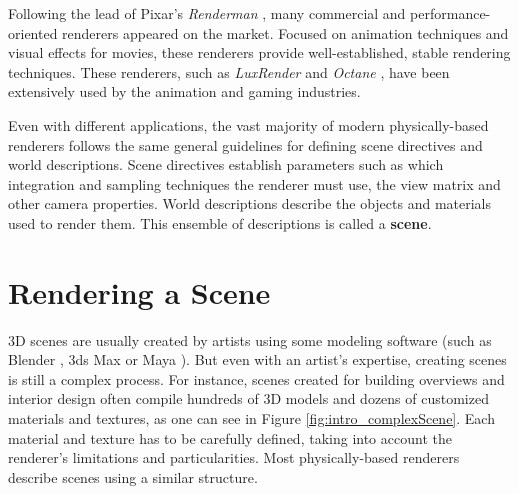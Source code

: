 Following the lead of Pixar's \textit{Renderman} \cite{renderman}, many 
commercial and performance-oriented renderers appeared on the market. Focused on 
animation techniques and visual effects for movies, these renderers provide 
well-established, stable rendering techniques. These renderers, such as 
\textit{LuxRender} \cite{luxrender} and \textit{Octane} \cite{octane}, 
have been extensively used by the animation and gaming industries.

Even with different applications, the vast majority of modern physically-based renderers 
follows the same general guidelines for defining scene directives and world 
descriptions. Scene directives establish parameters such as which integration 
and sampling techniques the renderer must use, the view matrix and other camera 
properties. World descriptions describe the objects and  
materials used to render them. This ensemble of descriptions is called a \textbf{scene}.

\section{Rendering a Scene}
%
3D scenes are usually created by artists using some modeling 
software (such as Blender \cite{blender}, 3ds Max \cite{3dsmax} or Maya \cite{maya}).
%
But even with an artist’s expertise, creating scenes is still a complex process. 
For instance, scenes created for building overviews and interior design often 
compile hundreds of 3D models and dozens of customized materials and textures, 
as one can see in Figure \ref{fig:intro_complexScene}. Each material and texture 
has to be carefully defined, taking into account the renderer's limitations and 
particularities.
%
Most physically-based renderers describe scenes using a similar structure.

